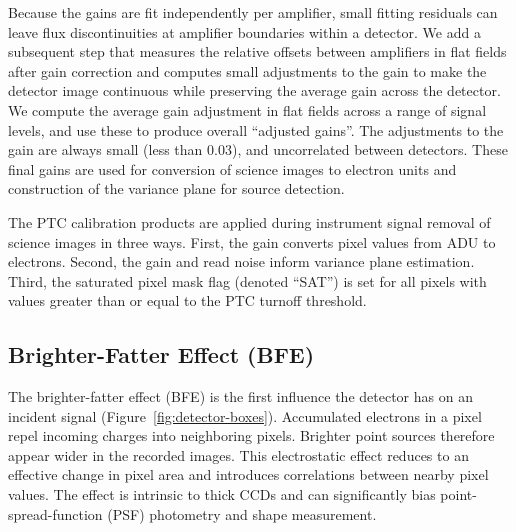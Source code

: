 Because the gains are fit independently per amplifier, small fitting residuals can leave flux discontinuities at amplifier boundaries within a detector.
We add a subsequent step that measures the relative offsets between amplifiers in flat fields after gain correction and computes small adjustments to the gain to make the detector image continuous while preserving the average gain across the detector.
We compute the average gain adjustment in flat fields across a range of signal levels, and use these to produce overall ``adjusted gains''.
The adjustments to the gain are always small (less than 0.03), and uncorrelated between detectors.
These final gains are used for conversion of science images to electron units and construction of the variance plane for source detection.

The PTC calibration products are applied during instrument signal removal of science images in three ways.
First, the gain converts pixel values from ADU to electrons.
Second, the gain and read noise inform variance plane estimation.
Third, the saturated pixel mask flag (denoted ``SAT'') is set for all pixels with values greater than or equal to the PTC turnoff threshold.



\subsection{Brighter-Fatter Effect (BFE)} \label{sec:processing:calibration:bf}

The brighter-fatter effect (BFE) is the first influence the detector has on an incident signal (Figure~\ref{fig:detector-boxes}).
Accumulated electrons in a pixel repel incoming charges into neighboring pixels.
Brighter point sources therefore appear wider in the recorded images.
This electrostatic effect reduces to an effective change in pixel area and introduces correlations between nearby pixel values.
The effect is intrinsic to thick CCDs and can significantly bias point-spread-function (PSF) photometry and shape measurement.


